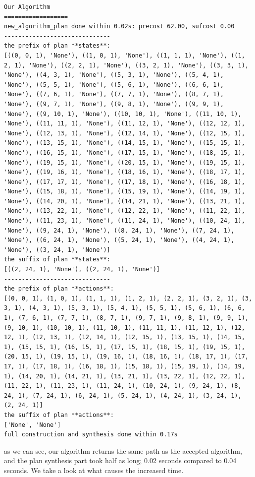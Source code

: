 \begin{lstlisting}
Our Algorithm
==================
new_algorithm_plan done within 0.02s: precost 62.00, sufcost 0.00
------------------------------
the prefix of plan **states**:
[((0, 0, 1), 'None'), ((1, 0, 1), 'None'), ((1, 1, 1), 'None'), ((1, 2, 1), 'None'), ((2, 2, 1), 'None'), ((3, 2, 1), 'None'), ((3, 3, 1), 'None'), ((4, 3, 1), 'None'), ((5, 3, 1), 'None'), ((5, 4, 1), 'None'), ((5, 5, 1), 'None'), ((5, 6, 1), 'None'), ((6, 6, 1), 'None'), ((7, 6, 1), 'None'), ((7, 7, 1), 'None'), ((8, 7, 1), 'None'), ((9, 7, 1), 'None'), ((9, 8, 1), 'None'), ((9, 9, 1), 'None'), ((9, 10, 1), 'None'), ((10, 10, 1), 'None'), ((11, 10, 1), 'None'), ((11, 11, 1), 'None'), ((11, 12, 1), 'None'), ((12, 12, 1), 'None'), ((12, 13, 1), 'None'), ((12, 14, 1), 'None'), ((12, 15, 1), 'None'), ((13, 15, 1), 'None'), ((14, 15, 1), 'None'), ((15, 15, 1), 'None'), ((16, 15, 1), 'None'), ((17, 15, 1), 'None'), ((18, 15, 1), 'None'), ((19, 15, 1), 'None'), ((20, 15, 1), 'None'), ((19, 15, 1), 'None'), ((19, 16, 1), 'None'), ((18, 16, 1), 'None'), ((18, 17, 1), 'None'), ((17, 17, 1), 'None'), ((17, 18, 1), 'None'), ((16, 18, 1), 'None'), ((15, 18, 1), 'None'), ((15, 19, 1), 'None'), ((14, 19, 1), 'None'), ((14, 20, 1), 'None'), ((14, 21, 1), 'None'), ((13, 21, 1), 'None'), ((13, 22, 1), 'None'), ((12, 22, 1), 'None'), ((11, 22, 1), 'None'), ((11, 23, 1), 'None'), ((11, 24, 1), 'None'), ((10, 24, 1), 'None'), ((9, 24, 1), 'None'), ((8, 24, 1), 'None'), ((7, 24, 1), 'None'), ((6, 24, 1), 'None'), ((5, 24, 1), 'None'), ((4, 24, 1), 'None'), ((3, 24, 1), 'None')]
the suffix of plan **states**:
[((2, 24, 1), 'None'), ((2, 24, 1), 'None')]
------------------------------
the prefix of plan **actions**:
[(0, 0, 1), (1, 0, 1), (1, 1, 1), (1, 2, 1), (2, 2, 1), (3, 2, 1), (3, 3, 1), (4, 3, 1), (5, 3, 1), (5, 4, 1), (5, 5, 1), (5, 6, 1), (6, 6, 1), (7, 6, 1), (7, 7, 1), (8, 7, 1), (9, 7, 1), (9, 8, 1), (9, 9, 1), (9, 10, 1), (10, 10, 1), (11, 10, 1), (11, 11, 1), (11, 12, 1), (12, 12, 1), (12, 13, 1), (12, 14, 1), (12, 15, 1), (13, 15, 1), (14, 15, 1), (15, 15, 1), (16, 15, 1), (17, 15, 1), (18, 15, 1), (19, 15, 1), (20, 15, 1), (19, 15, 1), (19, 16, 1), (18, 16, 1), (18, 17, 1), (17, 17, 1), (17, 18, 1), (16, 18, 1), (15, 18, 1), (15, 19, 1), (14, 19, 1), (14, 20, 1), (14, 21, 1), (13, 21, 1), (13, 22, 1), (12, 22, 1), (11, 22, 1), (11, 23, 1), (11, 24, 1), (10, 24, 1), (9, 24, 1), (8, 24, 1), (7, 24, 1), (6, 24, 1), (5, 24, 1), (4, 24, 1), (3, 24, 1), (2, 24, 1)]
the suffix of plan **actions**:
['None', 'None']
full construction and synthesis done within 0.17s 
\end{lstlisting}
as we can see, our algorithm returns the same path as the accepted algorithm, and the plan synthesis part took half as long; 0.02 seconds compared to 0.04 seconds. We take a look at what causes the increased time. 

